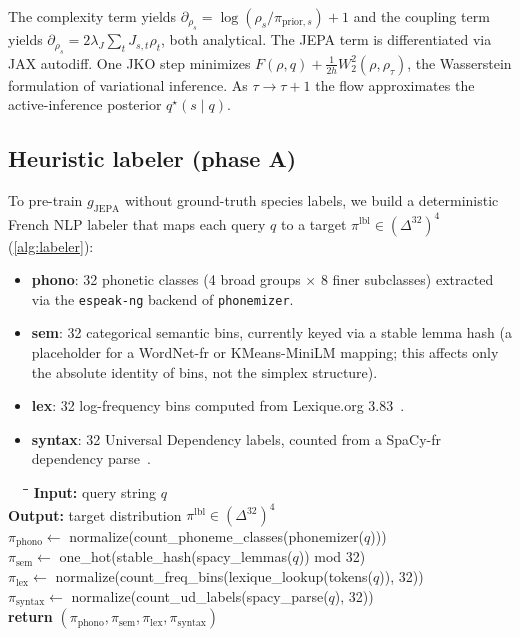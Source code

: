 The complexity term yields
$\partial_{\rho_s} = \log(\rho_s / \pi_{\mathrm{prior},s}) + 1$
and the coupling term yields
$\partial_{\rho_s} = 2 \lambda_J \sum_{t} J_{s,t} \rho_t$,
both analytical. The JEPA term is differentiated via JAX autodiff.
One JKO step minimizes
$F(\rho, q) + \tfrac{1}{2h} W_2^2(\rho, \rho_\tau)$,
the Wasserstein formulation of variational inference. As
$\tau \to \tau+1$ the flow approximates the active-inference
posterior $q^\star(s \mid q)$.

\subsection{Heuristic labeler (phase A)}
\label{sec:labeler}

To pre-train $g_{\mathrm{JEPA}}$ without ground-truth species
labels, we build a deterministic French NLP labeler that maps each
query $q$ to a target
$\pi^{\mathrm{lbl}} \in (\Delta^{32})^4$
(\cref{alg:labeler}):

\begin{itemize}
    \item \textbf{phono}: 32 phonetic classes (4 broad groups
        $\times$ 8 finer subclasses) extracted via the
        \texttt{espeak-ng} backend of \texttt{phonemizer}.
    \item \textbf{sem}: 32 categorical semantic bins, currently
        keyed via a stable lemma hash (a placeholder for a
        WordNet-fr or KMeans-MiniLM mapping; this affects only
        the absolute identity of bins, not the simplex
        structure).
    \item \textbf{lex}: 32 log-frequency bins computed from
        Lexique.org 3.83~\citep{newboucard2004lexique}.
    \item \textbf{syntax}: 32 Universal Dependency labels,
        counted from a SpaCy-fr dependency
        parse~\citep{honnibal2020spacy}.
\end{itemize}

\begin{algorithm}[ht]
  \caption{Heuristic labeler (phase A target)}
  \label{alg:labeler}
  \small
  \begin{tabbing}
    ~~~\=\quad\=\quad\=\quad\kill
    \textbf{Input:} query string $q$ \\
    \textbf{Output:} target distribution
        $\pi^{\mathrm{lbl}} \in (\Delta^{32})^4$ \\[1ex]
    \> $\pi_{\mathrm{phono}} \leftarrow$ normalize(count\_phoneme\_classes(phonemizer($q$))) \\
    \> $\pi_{\mathrm{sem}}   \leftarrow$ one\_hot(stable\_hash(spacy\_lemmas($q$)) mod 32) \\
    \> $\pi_{\mathrm{lex}}   \leftarrow$ normalize(count\_freq\_bins(lexique\_lookup(tokens($q$)), 32)) \\
    \> $\pi_{\mathrm{syntax}} \leftarrow$ normalize(count\_ud\_labels(spacy\_parse($q$), 32)) \\
    \> \textbf{return} $(\pi_{\mathrm{phono}}, \pi_{\mathrm{sem}}, \pi_{\mathrm{lex}}, \pi_{\mathrm{syntax}})$
  \end{tabbing}
\end{algorithm}

